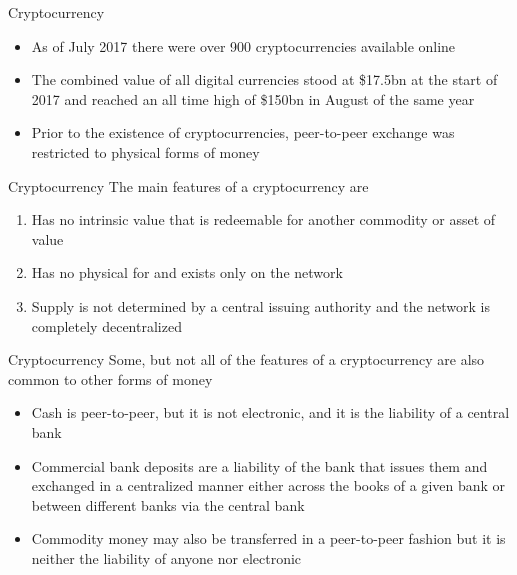 \documentclass[9pt]{beamer}
\begin{document}


\begin{frame}{Cryptocurrency}
	\begin{itemize}
		\item As of July 2017 there were over 900 cryptocurrencies available online
		\item The combined value of all digital currencies stood at \$17.5bn at the start of 2017 and reached an all time high of \$150bn in August of the same year
		\item Prior to the existence of cryptocurrencies, peer-to-peer exchange was restricted to physical forms of money
	\end{itemize}
\end{frame}


\begin{frame}{Cryptocurrency}
	The main features of a cryptocurrency are
	\begin{enumerate}
		\item Has no intrinsic value that is redeemable for another commodity or asset of value
		\item Has no physical for and exists only on the network
		\item Supply is not determined by a central issuing authority and the network is completely decentralized
	\end{enumerate}
\end{frame}


\begin{frame}{Cryptocurrency}
	Some, but not all of the features of a cryptocurrency are also common to other forms of money
	\begin{itemize}
		\item Cash is peer-to-peer, but it is not electronic, and it is the liability of a central bank
		\item Commercial bank deposits are a liability of the bank that issues them and exchanged in a centralized manner either across the books of a given bank or between different banks via the central bank
		\item Commodity money may also be transferred in a peer-to-peer fashion but it is neither the liability of anyone nor electronic
	\end{itemize}
\end{frame}
\end{document}
